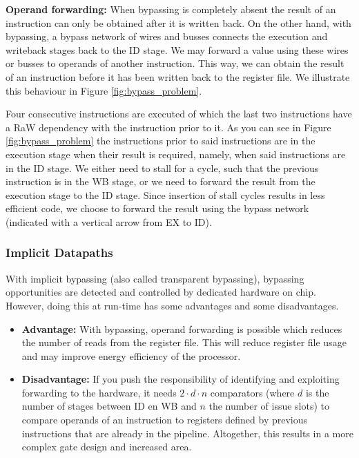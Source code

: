 \textbf{Operand forwarding:} When bypassing is completely absent the result of an instruction can only be obtained after it is written back. On the other hand, with bypassing, a bypass network of wires and busses connects the execution and writeback stages back to the ID stage. We may forward a value using these wires or busses to operands of another instruction. This way, we can obtain the result of an instruction before it has been written back to the register file. We illustrate this behaviour in Figure \ref{fig:bypass_problem}.

Four consecutive instructions are executed of which the last two instructions have a RaW dependency with the instruction prior to it. As you can see in Figure \ref{fig:bypass_problem} the instructions prior to said instructions are in the execution stage when their result is required, namely, when said instructions are in the ID stage. We either need to stall for a cycle, such that the previous instruction is in the WB stage, or we need to forward the result from the execution stage to the ID stage. Since insertion of stall cycles results in less efficient code, we choose to forward the result using the bypass network (indicated with a vertical arrow from EX to ID).

\subsubsection{Implicit Datapaths}
With implicit bypassing (also called transparent bypassing), bypassing opportunities are detected and controlled by dedicated hardware on chip. However, doing this at run-time has some advantages and some disadvantages.
\begin{itemize}
  \item\textbf{Advantage:} 
    With bypassing, operand forwarding is possible which reduces the number of reads from the register file. This will reduce register file usage and may improve energy efficiency of the processor.
  \item\textbf{Disadvantage:} 
    If you push the responsibility of identifying and exploiting forwarding to the hardware, it needs $2\cdot d\cdot n$ comparators (where $d$ is the number of stages between ID en WB and $n$ the number of issue slots) to compare operands of an instruction to registers defined by previous instructions that are already in the pipeline. Altogether, this results in a more complex gate design and increased area.
\end{itemize}

